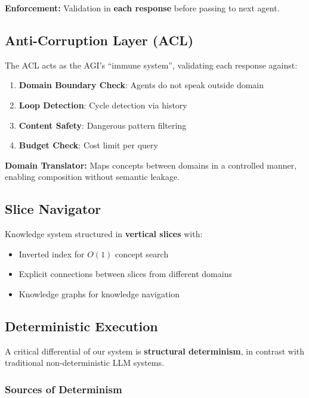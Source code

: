 \documentclass[11pt]{article}
\begin{document}
\textbf{Enforcement:} Validation in \textbf{each response} before passing to next agent.

\subsection{Anti-Corruption Layer (ACL)}

The ACL acts as the AGI's ``immune system'', validating each response against:

\begin{enumerate}
    \item \textbf{Domain Boundary Check}: Agents do not speak outside domain
    \item \textbf{Loop Detection}: Cycle detection via history
    \item \textbf{Content Safety}: Dangerous pattern filtering
    \item \textbf{Budget Check}: Cost limit per query
\end{enumerate}

\textbf{Domain Translator:} Maps concepts between domains in a controlled manner, enabling composition without semantic leakage.

\subsection{Slice Navigator}

Knowledge system structured in \textbf{vertical slices} with:

\begin{itemize}
    \item Inverted index for $O(1)$ concept search
    \item Explicit connections between slices from different domains
    \item Knowledge graphs for knowledge navigation
\end{itemize}

\subsection{Deterministic Execution}

A critical differential of our system is \textbf{structural determinism}, in contrast with traditional non-deterministic LLM systems.

\subsubsection{Sources of Determinism}
\end{document}
